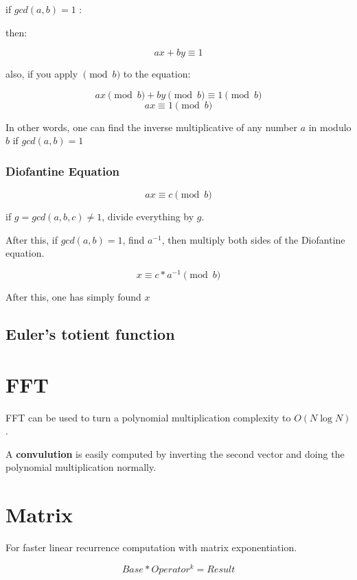 	if \textbf{ $gcd(a, b) = 1$ }:

	then:

	$$ax + by \equiv 1$$

	also, if you apply $\pmod{b}$ to the equation:

	$$ ax \pmod{b} + by \pmod{b} \equiv 1 \pmod{b} $$
	$$ ax \equiv 1 \pmod{b} $$

	In other words, one can find the inverse multiplicative of any number $a$ in modulo $b$ if $gcd(a, b) = 1$

	\subsubsection{Diofantine Equation}

	$$ ax \equiv c \pmod{b} $$

	if $g = gcd({a, b, c}) \neq 1$, divide everything by $g$.

	After this, if $gcd(a, b) = 1$, find $a^{-1}$, then multiply both sides of the Diofantine equation.

	$$ x \equiv c * a^{-1} \pmod{b} $$

	After this, one has simply found $x$


\subsection{Euler's totient function}


\section{FFT}

	FFT can be used to turn a polynomial multiplication complexity to $O(N \log{N})$.

	A \textbf{convulution} is easily computed by inverting the second vector and doing the polynomial multiplication normally.



\section{Matrix}

For faster linear recurrence computation with matrix exponentiation. 

$$ Base * Operator^{k} = Result $$

